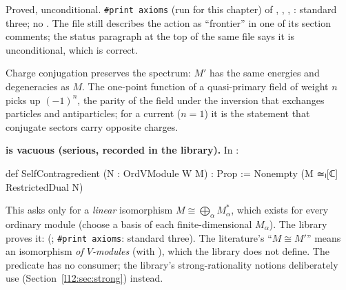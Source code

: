 \begin{status}
Proved, unconditional. \texttt{\#print axioms} (run for this chapter) of ,
, ,
: standard three; no . The file
 still describes the action as ``frontier'' in one of its section comments; the
status paragraph at the top of the same file says it is unconditional, which is correct.
\end{status}

\begin{physics}
Charge conjugation preserves the spectrum: $M'$ has the same energies and degeneracies as $M$. The one-point function of
a quasi-primary field of weight $n$ picks up $(-1)^n$, the parity of the field under the inversion that exchanges
particles and antiparticles; for a current ($n = 1$) it is the statement that conjugate sectors carry opposite charges.
\end{physics}

\begin{warning}
\textbf{ is vacuous (serious, recorded in the library).} In
:
\begin{leancode}
def SelfContragredient (N : OrdVModule W M) : Prop :=
  Nonempty (M ≃ₗ[ℂ] RestrictedDual N)
\end{leancode}
This asks only for a \emph{linear} isomorphism $M\cong\bigoplus_\alpha M_\alpha^*$, which exists for every ordinary module
(choose a basis of each finite-dimensional $M_\alpha$). The library proves it:
(; \texttt{\#print axioms}: standard three). The
literature's ``$M\cong M'$'' means an isomorphism \emph{of $V$-modules} (with ), which the
library does not define. The predicate has no consumer; the library's strong-rationality notions deliberately use
 (Section~\ref{l12:sec:strong}) instead.
\end{warning}


